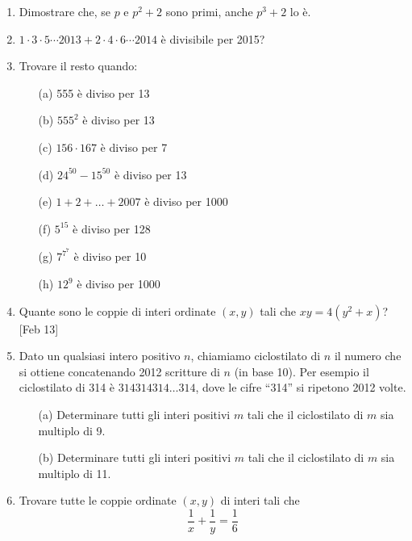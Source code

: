 \documentclass[a4paper]{article}
\theoremstyle{remark}
\theoremstyle{definition}
\begin{document}
\begin{enumerate}
	\item Dimostrare che, se $ p $ e $ p^2 +2 $ sono primi, anche $ p^3 +2 $ lo è.
	
	\item $  1 \cdot 3 \cdot 5 \cdots 2013 + 2 \cdot 4 \cdot 6 \cdots 2014  $ è divisibile per 2015?
	
	\item Trovare il resto quando:
	\begin{itemize}
		\item [(a)] 555 è diviso per 13 \\
		\item [(b)] $ 555^2$ è diviso per 13\\
		\item [(c)] $ 156 \cdot 167 $ è diviso per 7 \\
		\item [(d)] $ 24^{50} - 15^{50} $ è diviso per 13\\
		\item [(e)] $ 1 + 2 + \dots + 2007 $ è diviso per 1000\\
		\item [(f)] $ 5^{15} $ è diviso per 128\\
		\item [(g)]$  7^{7^7} $ è diviso per 10\\
		\item [(h)] $ 12^9 $ è diviso per 1000\\
	\end{itemize}
	
	
	\item Quante sono le coppie di interi ordinate $ (x, y) $ tali che $ xy = 4(y^2 + x) $? [Feb 13] \\
	
	\item Dato un qualsiasi intero positivo $ n $, chiamiamo ciclostilato di $ n $ il numero che si ottiene concatenando 2012 scritture di $ n $ (in base 10). Per esempio il ciclostilato di 314 è $ 314314314\dots314 $, dove le cifre “314” si ripetono 2012 volte.
	\begin{itemize}
		\item [(a)] Determinare tutti gli interi positivi $ m $ tali che il ciclostilato di $ m $ sia multiplo di 9.
		\item [(b)] Determinare tutti gli interi positivi $ m $ tali che il ciclostilato di $ m $ sia multiplo di 11.
	\end{itemize}
	
	
	\item Trovare tutte le coppie ordinate $ (x, y) $ di interi tali che $$  \dfrac{1}{x} + \dfrac{1}{y} = \dfrac{1}{6}  $$
	
\end{enumerate}
\end{document}
